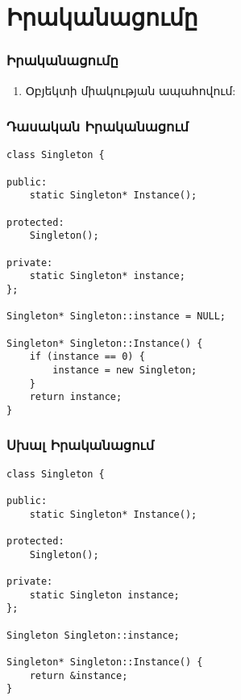 \documentclass{beamer}
\begin{document}
\section{Իրականացումը}
\begin{frame}\frametitle{Իրականացումը}
\begin{enumerate}
    \item Օբյեկտի միակության ապահովում:
\end{enumerate}
\end{frame}

\begin{frame}[fragile]\frametitle{Դասական Իրականացում}
\begin{english}
\begin{verbatim}
class Singleton {

public:
    static Singleton* Instance();

protected:
    Singleton();

private:
    static Singleton* instance;
};

Singleton* Singleton::instance = NULL;

Singleton* Singleton::Instance() {
    if (instance == 0) {
        instance = new Singleton;
    }
    return instance;
}
\end{verbatim}
\end{english}
\end{frame}

\begin{frame}[fragile]\frametitle{Սխալ Իրականացում}
\begin{english}
\begin{verbatim}
class Singleton {

public:
    static Singleton* Instance();

protected:
    Singleton();

private:
    static Singleton instance;
};

Singleton Singleton::instance;

Singleton* Singleton::Instance() {
    return &instance;
}
\end{verbatim}
\end{english}
\end{frame}
\end{document}
